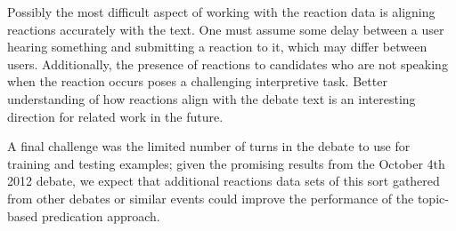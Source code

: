 
Possibly the most difficult aspect of working with the reaction data is aligning reactions accurately with the text. One must assume some delay between a user hearing something and submitting a reaction to it, which may differ between users. Additionally, the presence of reactions to candidates who are not speaking when the reaction occurs poses a challenging interpretive task. Better understanding of how reactions align with the debate text is an interesting direction for related work in the future.

A final challenge was the limited number of turns in the debate to use for training and testing examples; given the promising results from the October 4th 2012 debate, we expect that additional reactions data sets of this sort gathered from other debates or similar events could improve the performance of the topic-based predication approach.